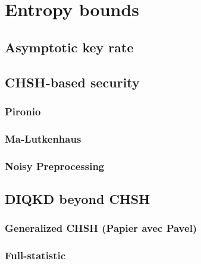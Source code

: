 \chapter{Entropy bounds}

\section{Asymptotic key rate}

\section{CHSH-based security}
\subsection{Pironio}
\subsection{Ma-Lutkenhaus}
\subsection{Noisy Preprocessing}

\section{DIQKD beyond CHSH}

\subsection{Generalized CHSH (Papier avec Pavel)}

\subsection{Full-statistic}
